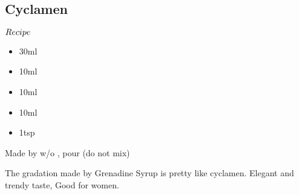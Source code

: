 \subsection{Cyclamen}
\begin{itembox}[l]{\boldmath $Recipe$}
\begin{itemize}
\setlength{\parskip}{0cm}
\setlength{\itemsep}{0cm}
\item \teq 30ml
\item \cointreau 10ml
\item \oj 10ml
\item \lj 10ml
\item \gs 1tsp
\end{itemize}
\vspace{-4mm}
Made by \shake w/o \gs
\hspace{-1mm}, pour \gs (do not mix)
\end{itembox}
The gradation made by Grenadine Syrup is pretty like cyclamen.  Elegant and trendy taste, Good for women.
